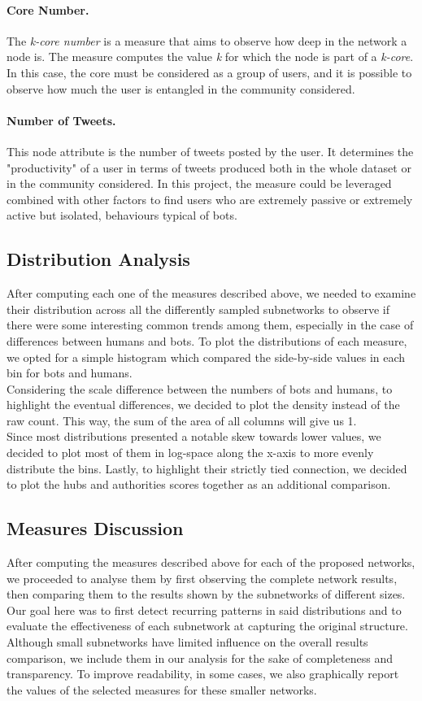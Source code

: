 \documentclass[12pt, a4paper]{article}
\begin{document}
		\paragraph{Core Number.} The \textit{k-core number} is a measure that aims to observe how deep in the network a node is. The measure computes the value \textit{k} for which the node is part of a \textit{k-core}. In this case, the core must be considered as a group of users, and it is possible to observe how much the user is entangled in the community considered.
        \paragraph{Number of Tweets.} This node attribute is the number of tweets posted by the user. It determines the "productivity" of a user in terms of tweets produced both in the whole dataset or in the community considered. In this project, the measure could be leveraged combined with other factors to find users who are extremely passive or extremely active but isolated, behaviours typical of bots.
	\subsection{Distribution Analysis}
    	After computing each one of the measures described above, we needed to examine their distribution across all the differently sampled subnetworks to observe if there were some interesting common trends among them, especially in the case of differences between humans and bots. To plot the distributions of each measure, we opted for a simple histogram which compared the side-by-side values in each bin for bots and humans.\\      
    	Considering the scale difference between the numbers of bots and humans, to highlight the eventual differences, we decided to plot the density instead of the raw count. This way, the sum of the area of all columns will give us 1.\\
    	Since most distributions presented a notable skew towards lower values, we decided to plot most of them in log-space along the x-axis to more evenly distribute the bins.
    	Lastly, to highlight their strictly tied connection, we decided to plot the hubs and authorities scores together as an additional comparison.
    \subsection{Measures Discussion}
    	After computing the measures described above for each of the proposed networks, we proceeded to analyse them by first observing the complete network results, then comparing them to the results shown by the subnetworks of different sizes. Our goal here was to first detect recurring patterns in said distributions and to evaluate the effectiveness of each subnetwork at capturing the original structure.\\
    	Although small subnetworks have limited influence on the overall results comparison, we include them in our analysis for the sake of completeness and transparency. To improve readability, in some cases, we also graphically report the values of the selected measures for these smaller networks.
\end{document}
